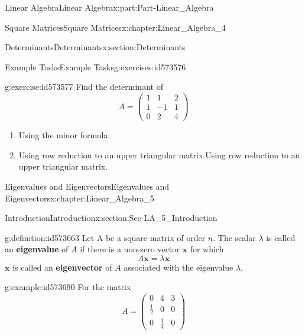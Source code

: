 \documentclass[oneside,10pt,]{book}
\newcommand{\terminology}[1]{\textbf{#1}}
\numberwithin{equation}{section}
\newcommand{\amp}{&}
\begin{document}
\begin{partptx}{Linear Algebra}{}{Linear Algebra}{}{}{x:part:Part-Linear_Algebra}
\begin{chapterptx}{Square Matrices}{}{Square Matrices}{}{}{x:chapter:Linear_Algebra_4}
\begin{sectionptx}{Determinants}{}{Determinants}{}{}{x:section:Determinants}
\begin{exercises-subsection-numberless}{Example Tasks}{}{Example Tasks}{}{}{g:exercises:id573576}
\begin{divisionexercise}{1}{}{}{g:exercise:id573577}%
Find the determinant of%
\begin{equation*}
A=\begin{pmatrix}
1 \amp 1 \amp 2  \\
1 \amp -1 \amp 1 \\
0 \amp 2 \amp 4 
\end{pmatrix}
\end{equation*}
%
\begin{enumerate}[label=\alph*]
\item{}Using the minor formula.%
\item{}Using row reduction to an upper triangular matrix.Using row reduction to an upper triangular matrix.%
\end{enumerate}
%
\end{divisionexercise}%
\end{exercises-subsection-numberless}
\end{sectionptx}
\end{chapterptx}
%
\typeout{************************************************}
\typeout{************************************************}
%
\begin{chapterptx}{Eigenvalues and Eigenvectors}{}{Eigenvalues and Eigenvectors}{}{}{x:chapter:Linear_Algebra_5}
%
%
\typeout{************************************************}
\typeout{************************************************}
%
\begin{sectionptx}{Introduction}{}{Introduction}{}{}{x:section:Sec-LA_5_Introduction}
\begin{definition}{}{g:definition:id573663}%
Let A be a square matrix of order \(n\). The scalar \(\lambda\) is called an \terminology{eigenvalue} of \(A\) if there is a non-zero vector \(\mathbf{x}\) for which%
\begin{equation*}
A\mathbf{x}=\lambda \mathbf{x}
\end{equation*}
\(\mathbf{x}\) is called an \terminology{eigenvector} of \(A\) associated with the eigenvalue \(\lambda\).%
\end{definition}
\begin{example}{}{g:example:id573690}%
For the matrix%
\begin{equation*}
A=\begin{pmatrix} 0 \amp 4 \amp 3 \\ \frac{1}{2} \amp 0 \amp 0 \\ 0 \amp \frac{1}{4} \amp 0 \end{pmatrix} 

\end{equation*}
\end{example}
\end{sectionptx}
\end{chapterptx}
\end{partptx}
\end{document}
